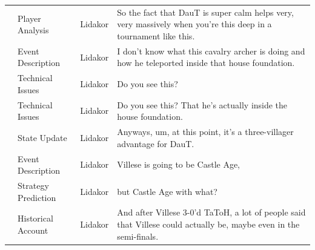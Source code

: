 {\begin{longtable}{@{}>{\theAppRow}r|L{2.3cm}L{1.0cm}U{11.55cm}@{}}
    & Player Analysis       & Lidakor & So the fact that DauT is super calm helps very, very massively when you're this deep in a tournament like this.                                                                                                                                                                                 \\
    & Event Description     & Lidakor & I don't know what this cavalry archer is doing and how he teleported inside that house foundation.                                                                                                                                                                                              \\
    & Technical Issues      & Lidakor & Do you see this?                                                                                                                                                                                                                                                                                \\
    & Technical Issues      & Lidakor & Do you see this? That he's actually inside the house foundation.                                                                                                                                                                                                                                \\
    & State Update          & Lidakor & Anyways, um, at this point, it's a three-villager advantage for DauT.                                                                                                                                                                                                                           \\
    & Event Description     & Lidakor & Villese is going to be Castle Age,                                                                                                                                                                                                                                                              \\
    & Strategy Prediction   & Lidakor & but Castle Age with what?                                                                                                                                                                                                                                                                       \\
    & Historical Account    & Lidakor & And after Villese 3-0'd TaToH, a lot of people said that Villese could actually be, maybe even in the semi-finals.                                                                                                                                                                              \\

\end{longtable}}
